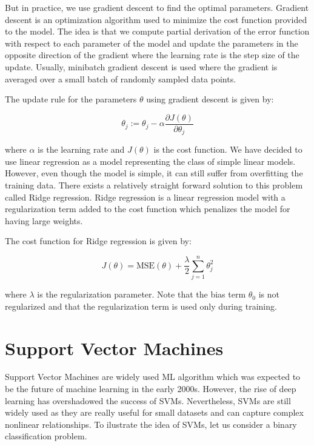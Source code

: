 But in practice, we use gradient descent to find the optimal parameters.
Gradient descent is an optimization algorithm used to minimize the cost
function provided to the model. The idea is that we compute
partial derivation of the error function with respect to each parameter
of the model and update the parameters in the opposite direction of the gradient
where the learning rate is the step size of the update. Usually, 
minibatch gradient descent is used where the gradient is averaged over a small
batch of randomly sampled data points.

The update rule for the parameters \(\theta\) using gradient descent is given by:

\begin{equation}
    \theta_j := \theta_j - \alpha \frac{\partial J(\theta)}{\partial \theta_j}
\end{equation}

where \(\alpha\) is the learning rate and \(J(\theta)\) is the cost function.
We have decided to use linear regression as a model representing 
the class of simple linear models. However, even though the model is simple,
it can still suffer from overfitting the training data. There exists
a relatively straight forward solution to this problem called Ridge regression.
Ridge regression is a linear regression model with a regularization term added to the cost function
which penalizes the model for having large weights. 

The cost function for Ridge regression is given by:

\begin{equation}
    J(\theta) = \text{MSE}(\theta) + \frac{\lambda}{2} \sum_{j=1}^{n} \theta_j^2
\end{equation}

where \( \lambda \) is the regularization parameter. Note that the bias term \(\theta_0\) is not regularized
and that the regularization term is used only during training.


\section{Support Vector Machines}

Support Vector Machines are widely used \ac{ML} algorithm which was expected to 
be the future of machine learning in the early 2000s. However, the rise of deep learning
has overshadowed the success of \ac{SVM}s. Nevertheless, \ac{SVM}s are still widely used
as they are really useful for small datasets and can capture complex nonlinear relationships.
To ilustrate the idea of \ac{SVM}s, let us consider a binary classification problem.

